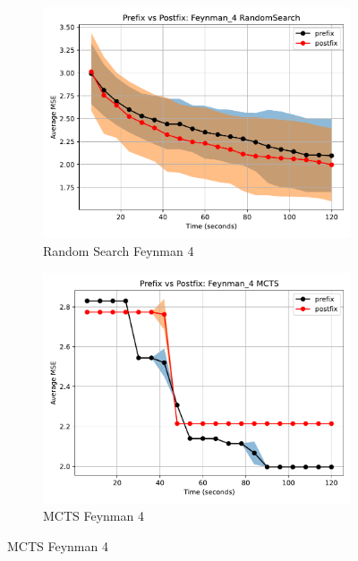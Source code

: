 \documentclass[12pt]{iopart}
\begin{document}
\begin{figure}
    \centering
    
    \begin{subfigure}[b]{0.4\textwidth}
        \includegraphics[width=\linewidth, keepaspectratio]{AIFeynman_Benchmarks/PrePostFeynman_4RandomSearch.pdf}
        \caption{Random Search Feynman 4}
        \label{subfig:feynman_4_RS}
    \end{subfigure}
    \begin{subfigure}[b]{0.4\textwidth}
        \includegraphics[width=\linewidth, keepaspectratio]{AIFeynman_Benchmarks/PrePostFeynman_4MCTS.pdf}
        \caption{MCTS Feynman 4}
        \label{subfig:feynman_4_MCTS}
    \end{subfigure}
    

\end{figure}
\end{document}
